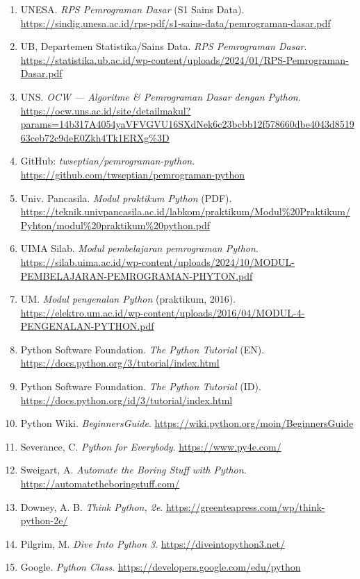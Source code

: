 \begin{enumerate}[leftmargin=*]
  \item UNESA. \textit{RPS Pemrograman Dasar} (S1 Sains Data). \url{https://sindig.unesa.ac.id/rps-pdf/s1-sains-data/pemrograman-dasar.pdf}
  \item UB, Departemen Statistika/Sains Data. \textit{RPS Pemrograman Dasar}. \url{https://statistika.ub.ac.id/wp-content/uploads/2024/01/RPS-Pemrograman-Dasar.pdf}
  \item UNS. \textit{OCW --- Algoritme \& Pemrograman Dasar dengan Python}. \url{https://ocw.uns.ac.id/site/detailmakul?params=14b317A4054yaVFVGVU16SXdNek6c23bcbb12f578660dbe4043d851963ceb72c9deE0Zkh4Tk1ERXg%3D}
  \item GitHub: \textit{twseptian/pemrograman-python}. \url{https://github.com/twseptian/pemrograman-python}
  \item Univ. Pancasila. \textit{Modul praktikum Python} (PDF). \url{https://teknik.univpancasila.ac.id/labkom/praktikum/Modul%20Praktikum/Pyhton/modul%20praktikum%20python.pdf}
  \item UIMA Silab. \textit{Modul pembelajaran pemrograman Python}. \url{https://silab.uima.ac.id/wp-content/uploads/2024/10/MODUL-PEMBELAJARAN-PEMROGRAMAN-PHYTON.pdf}
  \item UM. \textit{Modul pengenalan Python} (praktikum, 2016). \url{https://elektro.um.ac.id/wp-content/uploads/2016/04/MODUL-4-PENGENALAN-PYTHON.pdf}
  \item Python Software Foundation. \textit{The Python Tutorial} (EN). \url{https://docs.python.org/3/tutorial/index.html}
  \item Python Software Foundation. \textit{The Python Tutorial} (ID). \url{https://docs.python.org/id/3/tutorial/index.html}
  \item Python Wiki. \textit{BeginnersGuide}. \url{https://wiki.python.org/moin/BeginnersGuide}
  \item Severance, C. \textit{Python for Everybody}. \url{https://www.py4e.com/}
  \item Sweigart, A. \textit{Automate the Boring Stuff with Python}. \url{https://automatetheboringstuff.com/}
  \item Downey, A. B. \textit{Think Python, 2e}. \url{https://greenteapress.com/wp/think-python-2e/}
  \item Pilgrim, M. \textit{Dive Into Python 3}. \url{https://diveintopython3.net/}
  \item Google. \textit{Python Class}. \url{https://developers.google.com/edu/python}

\end{enumerate}
